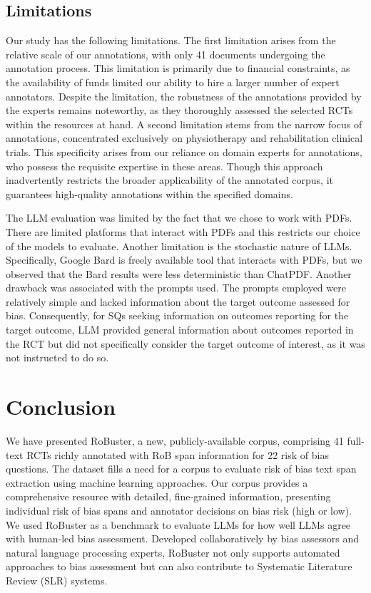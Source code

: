 \documentclass[sn-mathphys,Numbered]{sn-jnl}%
\theoremstyle{thmstyleone}%
\theoremstyle{thmstyletwo}%
\theoremstyle{thmstylethree}%
\begin{document}
\subsection{Limitations}
\label{subsec:limits}
%
Our study has the following limitations.
The first limitation arises from the relative scale of our annotations, with only 41 documents undergoing the annotation process.
This limitation is primarily due to financial constraints, as the availability of funds limited our ability to hire a larger number of expert annotators.
Despite the limitation, the robustness of the annotations provided by the experts remains noteworthy, as they thoroughly assessed the selected RCTs within the resources at hand.
A second limitation stems from the narrow focus of annotations, concentrated exclusively on physiotherapy and rehabilitation clinical trials.
This specificity arises from our reliance on domain experts for annotations, who possess the requisite expertise in these areas.
Though this approach inadvertently restricts the broader applicability of the annotated corpus, it guarantees high-quality annotations within the specified domains.


The LLM evaluation was limited by the fact that we chose to work with PDFs. 
There are limited platforms that interact with PDFs and this restricts our choice of the models to evaluate.
Another limitation is the stochastic nature of LLMs.
Specifically, Google Bard is freely available tool that interacts with PDFs, but we observed that the Bard results were less deterministic than ChatPDF.
Another drawback was associated with the prompts used.
The prompts employed were relatively simple and lacked information about the target outcome assessed for bias.
Consequently, for SQs seeking information on outcomes reporting for the target outcome, LLM provided general information about outcomes reported in the RCT but did not specifically consider the target outcome of interest, as it was not instructed to do so.
%
%
%
\section{Conclusion}
\label{sec:conclusion}
%
We have presented RoBuster, a new, publicly-available corpus, comprising 41 full-text RCTs richly annotated with RoB span information for 22 risk of bias questions.
The dataset fills a need for a corpus to evaluate risk of bias text span extraction using machine learning approaches.
Our corpus provides a comprehensive resource with detailed, fine-grained information, presenting individual risk of bias spans and annotator decisions on bias risk (high or low). 
We used RoBuster as a benchmark to evaluate LLMs for how well LLMs agree with human-led bias assessment.
Developed collaboratively by bias assessors and natural language processing experts, RoBuster not only supports automated approaches to bias assessment but can also contribute to Systematic Literature Review (SLR) systems.
\end{document}
